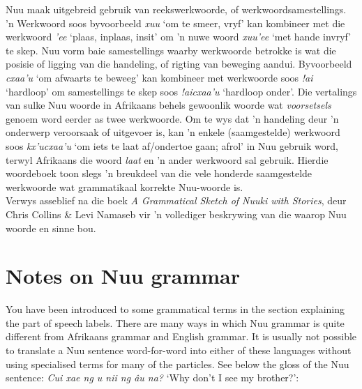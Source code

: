N\textipa{\textvertline}uu maak uitgebreid gebruik van
reekswerkwoorde, of werkwoordsamestellings. 'n Werkwoord soos
byvoorbeeld \emph{xuu} `om te smeer, vryf' kan kombineer
met die werkwoord \emph{\textipa{\textvertline}'ee} `plaas, inplaas,
insit' om 'n nuwe woord
\emph{xuu\textipa{\textvertline}'ee} `met hande invryf'
te skep. N\textipa{\textvertline}uu vorm baie samestellings waarby
werkwoorde betrokke is wat die posisie of ligging van die handeling,
of rigting van beweging aandui. Byvoorbeeld \emph{cxaa'u} `om afwaarts
te beweeg' kan kombineer met werkwoorde soos \emph{!ai} `hardloop' om
samestellings te skep soos \emph{!aicxaa'u} `hardloop onder'. Die
vertalings van sulke N\textipa{\textvertline}uu woorde in Afrikaans
behels gewoonlik woorde wat \emph{voorsetsels} genoem word eerder as
twee werkwoorde. Om te wys dat 'n handeling deur 'n onderwerp
veroorsaak of uitgevoer is, kan 'n enkele (saamgestelde) werkwoord
soos \emph{kx'ucxaa'u} `om iets te laat af/ondertoe gaan; afrol' in
N\textipa{\textvertline}uu gebruik word, terwyl Afrikaans die woord
\emph{laat} en 'n ander werkwoord sal gebruik. Hierdie woordeboek toon slegs
'n breukdeel van die vele honderde saamgestelde werkwoorde wat
grammatikaal korrekte N\textipa{\textvertline}uu-woorde is.\\

Verwys asseblief na die boek \emph{A Grammatical Sketch of
N\textipa{\textvertline}uuki with Stories}, deur Chris Collins \& Levi
Namaseb vir 'n vollediger beskrywing van die waarop
N\textipa{\textvertline}uu woorde en sinne bou.


\markboth{}{}
\addtocounter{section}{-1}
\tocless\section{Notes on N\textipa{\textvertline}uu grammar}
{}
\markboth{}{}

You have been introduced to some grammatical terms in the section
explaining the part of speech labels. There are many ways in which
N\textipa{\textvertline}uu grammar is quite different from Afrikaans
grammar and English grammar. It is usually not possible to translate a
N\textipa{\textvertline}uu sentence word-for-word into either of these
languages without using specialised terms for many of the particles.
See below the gloss of the N\textipa{\textvertline}uu sentence:
\emph{Cui xae ng \textipa{\textdoublevertline}u
n\textipa{\textvertline}ii ng \textipa{\textdoublevertline}\^{a}u
n\textipa{\textdoublevertline}a?} `Why don't I see my brother?':

